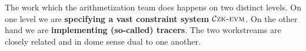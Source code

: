The work which the arithmetization team does happens on two distinct levels. On one level we are \textbf{specifying a vast constraint system} $\mathcal{C}\textsc{zk-evm}$. On the other hand we are \textbf{implementing (so-called) tracers}. The two workstreams are closely related and in dome sense dual to one another.
